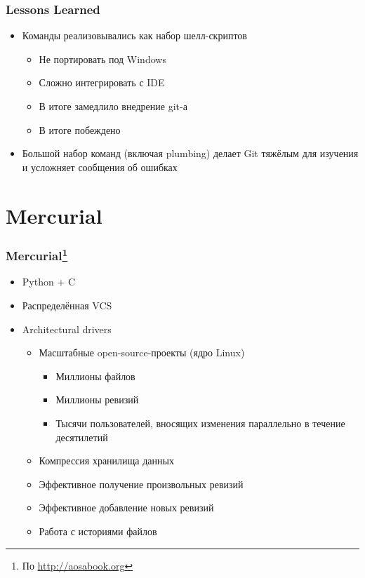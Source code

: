 \documentclass[xetex,mathserif,serif]{beamer}
\begin{document}
	\begin{frame}
		\frametitle{Lessons Learned}
		\begin{itemize}
			\item Команды реализовывались как набор шелл-скриптов
			\begin{itemize}
				\item Не портировать под Windows
				\item Сложно интегрировать с IDE
				\item В итоге замедлило внедрение git-а
				\item В итоге побеждено
			\end{itemize}
			\item Большой набор команд (включая plumbing) делает Git тяжёлым для изучения и усложняет сообщения об ошибках
		\end{itemize}
	\end{frame}

	\section{Mercurial}

	\begin{frame}
		\frametitle{Mercurial\footnote{\tiny{По \url{http://aosabook.org}}}}
		\begin{itemize}
			\item Python + C
			\item Распределённая VCS
			\item Architectural drivers
			\begin{itemize}
				\item Масштабные open-source-проекты (ядро Linux)
				\begin{itemize}
					\item Миллионы файлов
					\item Миллионы ревизий
					\item Тысячи пользователей, вносящих изменения параллельно в течение десятилетий
				\end{itemize}
				\item Компрессия хранилища данных
				\item Эффективное получение произвольных ревизий
				\item Эффективное добавление новых ревизий
				\item Работа с историями файлов
			\end{itemize}
		\end{itemize}
	\end{frame}
\end{document}
